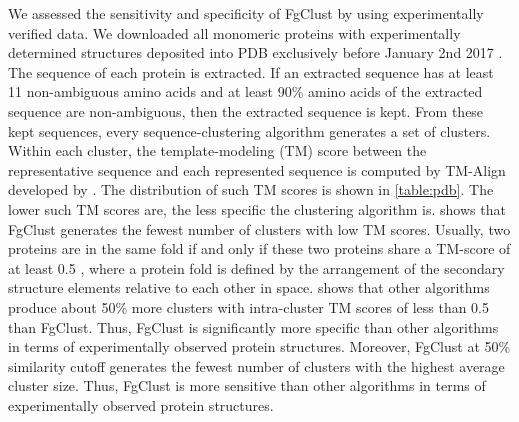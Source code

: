 \documentclass[11pt,letterpaper]{article}
\begin{document}
We assessed the sensitivity and specificity of FgClust by using experimentally verified data.
We downloaded all monomeric proteins with experimentally determined structures deposited into PDB exclusively before January 2nd 2017 \citep{berman2006protein}.
The sequence of each protein is extracted.
If an extracted sequence has at least 11 non-ambiguous amino acids and at least 90\% amino acids of the extracted sequence are non-ambiguous, then the extracted sequence is kept.
From these kept sequences, every sequence-clustering algorithm generates a set of clusters.
Within each cluster, the template-modeling (TM) score between the representative sequence and each represented sequence is computed by TM-Align developed by \citet{zhang2005tm}.
The distribution of such TM scores is shown in \cref{table:pdb}.
The lower such TM scores are, the less specific the clustering algorithm is.
 shows that FgClust generates the fewest number of clusters with low TM scores.
Usually, two proteins are in the same fold if and only if these two proteins share a TM-score of at least 0.5 \citep{xu2010significant}, where a protein fold is defined by the arrangement of the secondary structure elements relative to each other in space.
 shows that other algorithms produce about 50\% more clusters with intra-cluster TM scores of less than 0.5 than FgClust.
Thus, FgClust is significantly more specific than other algorithms in terms of experimentally observed protein structures.
Moreover, FgClust at 50\% similarity cutoff generates the fewest number of clusters with the highest average cluster size.
Thus, FgClust is more sensitive than other algorithms in terms of experimentally observed protein structures.
\end{document}
